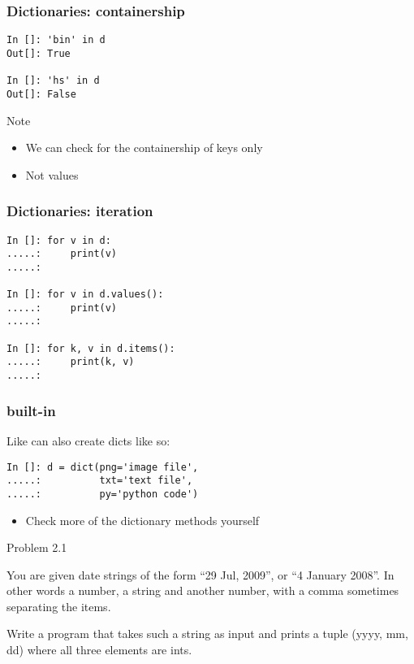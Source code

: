 \documentclass[14pt,compress]{beamer}
\begin{document}
\begin{frame}[fragile]
  \frametitle{Dictionaries: containership}
  \begin{lstlisting}
In []: 'bin' in d
Out[]: True

In []: 'hs' in d
Out[]: False
  \end{lstlisting}
  \begin{block}{Note}
    \begin{itemize}
      \item We can check for the containership of keys only
      \item Not values
    \end{itemize}
  \end{block}
\end{frame}

\begin{frame}[fragile]
  \frametitle{Dictionaries:  iteration}
  \begin{lstlisting}
In []: for v in d:
.....:     print(v)
.....:

In []: for v in d.values():
.....:     print(v)
.....:

In []: for k, v in d.items():
.....:     print(k, v)
.....:
  \end{lstlisting}
\end{frame}

\begin{frame}[fragile]
  \frametitle{ built-in}
Like  can also create dicts like so:
\begin{lstlisting}
In []: d = dict(png='image file',
.....:          txt='text file',
.....:          py='python code')
\end{lstlisting}
\begin{itemize}
\item Check more of the dictionary methods yourself
\end{itemize}
\end{frame}

\begin{frame} {Problem 2.1}

  You are given date strings of the form ``29 Jul, 2009'', or ``4 January
  2008''. In other words a number, a string and another number, with a comma
  sometimes separating the items.

  Write a program that takes such a string as input and prints a tuple (yyyy,
  mm, dd) where all three elements are ints.
\end{frame}
\end{document}
